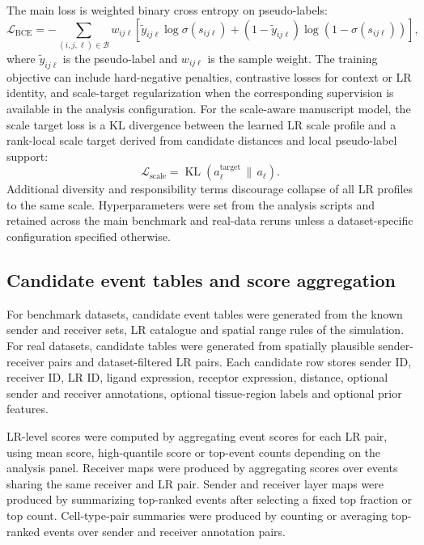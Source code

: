 \documentclass[referee,lineno,pdflatex,sn-vancouver-num]{sn-jnl}
\begin{document}
The main loss is weighted binary cross entropy on pseudo-labels:
\begin{equation}
\mathcal{L}_{\mathrm{BCE}} =
-\sum_{(i,j,\ell)\in \mathcal{B}} w_{ij\ell}
\left[\tilde{y}_{ij\ell}\log \sigma(s_{ij\ell})+
(1-\tilde{y}_{ij\ell})\log(1-\sigma(s_{ij\ell}))\right],
\end{equation}
where $\tilde{y}_{ij\ell}$ is the pseudo-label and $w_{ij\ell}$ is the sample weight. The training objective can include hard-negative penalties, contrastive losses for context or LR identity, and scale-target regularization when the corresponding supervision is available in the analysis configuration. For the scale-aware manuscript model, the scale target loss is a KL divergence between the learned LR scale profile and a rank-local scale target derived from candidate distances and local pseudo-label support:
\begin{equation}
\mathcal{L}_{\mathrm{scale}} =
\operatorname{KL}(a_\ell^{\mathrm{target}}\,\|\,a_\ell).
\end{equation}
Additional diversity and responsibility terms discourage collapse of all LR profiles to the same scale. Hyperparameters were set from the analysis scripts and retained across the main benchmark and real-data reruns unless a dataset-specific configuration specified otherwise.

\subsection{Candidate event tables and score aggregation}

For benchmark datasets, candidate event tables were generated from the known sender and receiver sets, LR catalogue and spatial range rules of the simulation. For real datasets, candidate tables were generated from spatially plausible sender-receiver pairs and dataset-filtered LR pairs. Each candidate row stores sender ID, receiver ID, LR ID, ligand expression, receptor expression, distance, optional sender and receiver annotations, optional tissue-region labels and optional prior features.

LR-level scores were computed by aggregating event scores for each LR pair, using mean score, high-quantile score or top-event counts depending on the analysis panel. Receiver maps were produced by aggregating scores over events sharing the same receiver and LR pair. Sender and receiver layer maps were produced by summarizing top-ranked events after selecting a fixed top fraction or top count. Cell-type-pair summaries were produced by counting or averaging top-ranked events over sender and receiver annotation pairs.
\end{document}
